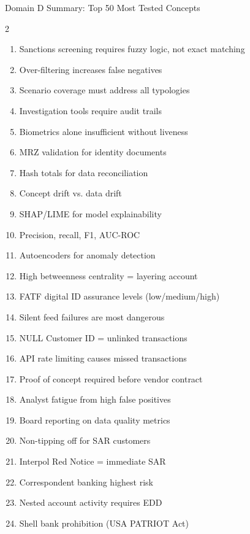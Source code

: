 \documentclass[11pt,a4paper]{beamer}
\begin{document}
\begin{frame}{Domain D Summary: Top 50 Most Tested Concepts}
\begin{multicols}{2}
\begin{enumerate}
			\item Sanctions screening requires fuzzy logic, not exact matching
			\item Over-filtering increases false negatives
			\item Scenario coverage must address all typologies
			\item Investigation tools require audit trails
			\item Biometrics alone insufficient without liveness
			\item MRZ validation for identity documents
			\item Hash totals for data reconciliation
			\item Concept drift vs. data drift
			\item SHAP/LIME for model explainability
			\item Precision, recall, F1, AUC-ROC
			\item Autoencoders for anomaly detection
			\item High betweenness centrality = layering account
			\item FATF digital ID assurance levels (low/medium/high)
			\item Silent feed failures are most dangerous
			\item NULL Customer ID = unlinked transactions
			\item API rate limiting causes missed transactions
			\item Proof of concept required before vendor contract
			\item Analyst fatigue from high false positives
			\item Board reporting on data quality metrics
			\item Non-tipping off for SAR customers
			\item Interpol Red Notice = immediate SAR
			\item Correspondent banking highest risk
			\item Nested account activity requires EDD
			\item Shell bank prohibition (USA PATRIOT Act)
		\end{enumerate}
	\end{multicols}
\end{frame}
\end{document}
